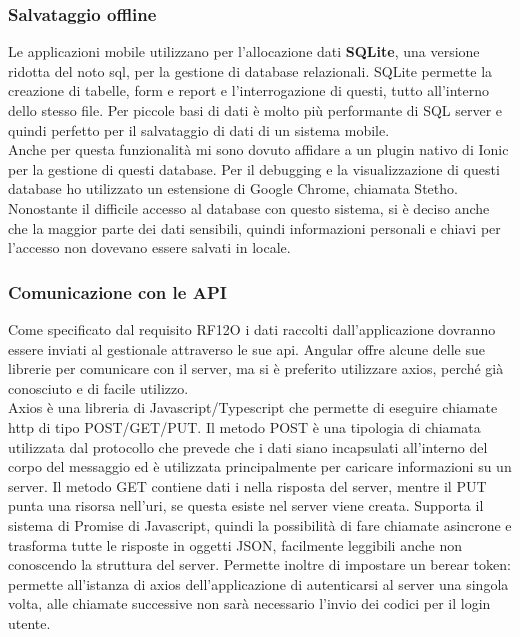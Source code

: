 \subsubsection{Salvataggio offline}
Le applicazioni mobile utilizzano per l'allocazione dati \textbf{SQLite}, una versione ridotta del noto \acrshort{sql}, per la gestione di
\gls{database} relazionali. SQLite permette la creazione di tabelle, form e report e l'interrogazione di questi, tutto all'interno dello
stesso file. Per piccole basi di dati è molto più performante di SQL server e quindi perfetto per il salvataggio di dati di un sistema
mobile. \\
\noindent Anche per questa funzionalità mi sono dovuto affidare a un plugin nativo di Ionic per la gestione di questi database. Per il
debugging e la visualizzazione di questi database ho utilizzato un estensione di Google Chrome, chiamata Stetho.\\
\noindent Nonostante il difficile accesso al database con questo sistema, si è deciso anche che la maggior parte dei dati sensibili, quindi
informazioni personali e chiavi per l'accesso non dovevano essere salvati in locale. 

\subsubsection{Comunicazione con le API}
Come specificato dal requisito RF12O i dati raccolti dall'applicazione dovranno essere inviati al gestionale attraverso
le sue \acrshort{api}. Angular offre alcune delle sue librerie per comunicare con il server, ma si è preferito utilizzare
axios, perché già conosciuto e di facile utilizzo. \\
Axios è una libreria di Javascript/Typescript che permette di eseguire chiamate \acrshort{http} di tipo POST/GET/PUT. Il
metodo POST è una tipologia di chiamata utilizzata dal protocollo che prevede che i dati siano incapsulati all'interno
del corpo del messaggio ed è utilizzata principalmente per caricare informazioni su un server. Il metodo GET contiene
dati i nella risposta del server, mentre il PUT punta una risorsa nell'\acrshort{uri}, se questa esiste nel server viene
creata. Supporta il sistema di Promise di Javascript, quindi la possibilità di fare chiamate asincrone e trasforma tutte
le risposte in oggetti JSON, facilmente leggibili anche non conoscendo la struttura del server. Permette inoltre di
impostare un berear token: permette all'istanza di axios dell'applicazione di autenticarsi al server una singola volta,
alle chiamate successive non sarà necessario l'invio dei codici per il login utente.